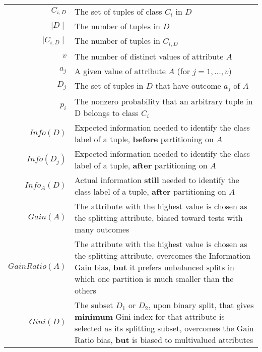 \documentclass{article}
\begin{document}
\begin{longtable}{Rp{13cm}}
                \textbf{$C_{i, D}$} & The set of tuples of class $C_i$ in $D$\\

                $\mid D \mid$ & The number of tuples in $D$\\

                $\mid C_{i, D} \mid$ & The number of tuples in $C_{i, D}$\\

                $v$ & The number of distinct values of attribute $A$\\

                $a_j$ & A given value of attribute $A$ (for $j = 1, ..., v$)\\

                $D_j$ & The set of tuples in $D$ that have outcome $a_j$ of $A$\\

                $p_i$ & The nonzero probability that an arbitrary tuple in D belongs to class $C_i$\\

                $Info(D)$ & Expected information needed to identify the class label of a tuple, \textbf{before} partitioning on $A$\\

                $Info(D_j)$ & Expected information needed to identify the class label of a tuple, \textbf{after} partitioning on $A$\\

                $Info_A(D)$ & Actual information \textbf{still} needed to identify the class label of a tuple, \textbf{after} partitioning on $A$\\

                $Gain(A)$ & The attribute with the highest value is chosen as the splitting attribute, biased toward tests with many outcomes\\

                $GainRatio(A)$ & The attribute with the highest value is chosen as the splitting attribute, overcomes the Information Gain bias, \textbf{but} it prefers unbalanced splits in which one partition is much smaller than the others\\

                $Gini(D)$ & The subset $D_1$ or $D_2$, upon binary split, that gives \textbf{minimum} Gini index for that attribute is selected as its splitting subset, overcomes the Gain Ratio bias, \textbf{but} is biased to multivalued attributes\\


\end{longtable}
\end{document}
